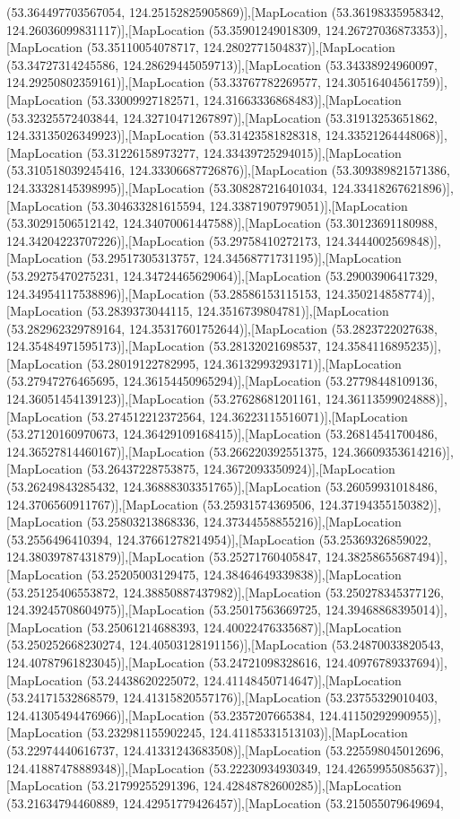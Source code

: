 (53.364497703567054, 124.25152825905869)],[MapLocation (53.36198335958342, 124.26036099831117)],[MapLocation (53.35901249018309, 124.26727036873353)],[MapLocation (53.35110054078717, 124.2802771504837)],[MapLocation (53.34727314245586, 124.28629445059713)],[MapLocation (53.34338924960097, 124.29250802359161)],[MapLocation (53.33767782269577, 124.30516404561759)],[MapLocation (53.33009927182571, 124.31663336868483)],[MapLocation (53.32325572403844, 124.32710471267897)],[MapLocation (53.31913253651862, 124.33135026349923)],[MapLocation (53.31423581828318, 124.33521264448068)],[MapLocation (53.31226158973277, 124.33439725294015)],[MapLocation (53.310518039245416, 124.33306687726876)],[MapLocation (53.309389821571386, 124.33328145398995)],[MapLocation (53.308287216401034, 124.33418267621896)],[MapLocation (53.304633281615594, 124.33871907979051)],[MapLocation (53.30291506512142, 124.34070061447588)],[MapLocation (53.30123691180988, 124.34204223707226)],[MapLocation (53.29758410272173, 124.3444002569848)],[MapLocation (53.29517305313757, 124.34568771731195)],[MapLocation (53.29275470275231, 124.34724465629064)],[MapLocation (53.29003906417329, 124.34954117538896)],[MapLocation (53.28586153115153, 124.350214858774)],[MapLocation (53.2839373044115, 124.3516739804781)],[MapLocation (53.282962329789164, 124.35317601752644)],[MapLocation (53.2823722027638, 124.35484971595173)],[MapLocation (53.28132021698537, 124.3584116895235)],[MapLocation (53.28019122782995, 124.36132993293171)],[MapLocation (53.27947276465695, 124.36154450965294)],[MapLocation (53.27798448109136, 124.36051454139123)],[MapLocation (53.27628681201161, 124.36113599024888)],[MapLocation (53.274512212372564, 124.36223115516071)],[MapLocation (53.27120160970673, 124.36429109168415)],[MapLocation (53.26814541700486, 124.36527814460167)],[MapLocation (53.266220392551375, 124.36609353614216)],[MapLocation (53.26437228753875, 124.3672093350924)],[MapLocation (53.26249843285432, 124.36888303351765)],[MapLocation (53.26059931018486, 124.3706560911767)],[MapLocation (53.25931574369506, 124.37194355150382)],[MapLocation (53.25803213868336, 124.37344558855216)],[MapLocation (53.2556496410394, 124.37661278214954)],[MapLocation (53.25369326859022, 124.38039787431879)],[MapLocation (53.25271760405847, 124.38258655687494)],[MapLocation (53.25205003129475, 124.38464649339838)],[MapLocation (53.25125406553872, 124.38850887437982)],[MapLocation (53.250278345377126, 124.39245708604975)],[MapLocation (53.25017563669725, 124.39468868395014)],[MapLocation (53.25061214688393, 124.40022476335687)],[MapLocation (53.250252668230274, 124.40503128191156)],[MapLocation (53.24870033820543, 124.40787961823045)],[MapLocation (53.24721098328616, 124.40976789337694)],[MapLocation (53.24438620225072, 124.41148450714647)],[MapLocation (53.24171532868579, 124.41315820557176)],[MapLocation (53.23755329010403, 124.41305494476966)],[MapLocation (53.2357207665384, 124.41150292990955)],[MapLocation (53.232981155902245, 124.41185331513103)],[MapLocation (53.22974440616737, 124.41331243683508)],[MapLocation (53.225598045012696, 124.41887478889348)],[MapLocation (53.22230934930349, 124.42659955085637)],[MapLocation (53.21799255291396, 124.42848782600285)],[MapLocation (53.21634794460889, 124.42951779426457)],[MapLocation (53.215055079649694, 